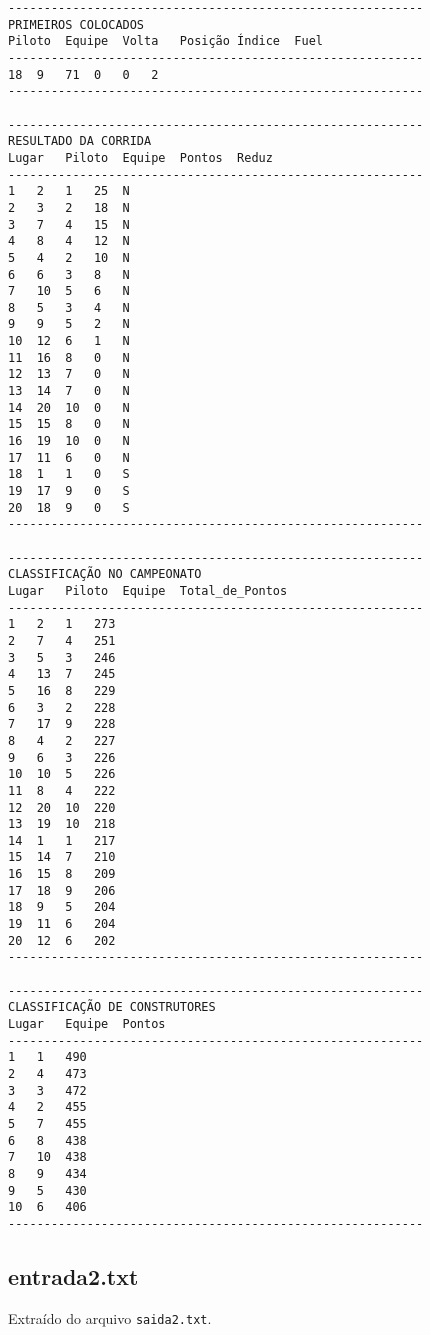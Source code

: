 \documentclass[12pt]{article}
\begin{document}
\begin{verbatim}
----------------------------------------------------------
PRIMEIROS COLOCADOS
Piloto	Equipe	Volta	Posição	Índice	Fuel
----------------------------------------------------------
18	9	71	0	0	2
----------------------------------------------------------

----------------------------------------------------------
RESULTADO DA CORRIDA
Lugar	Piloto	Equipe	Pontos	Reduz
----------------------------------------------------------
1	2	1	25	N
2	3	2	18	N
3	7	4	15	N
4	8	4	12	N
5	4	2	10	N
6	6	3	8	N
7	10	5	6	N
8	5	3	4	N
9	9	5	2	N
10	12	6	1	N
11	16	8	0	N
12	13	7	0	N
13	14	7	0	N
14	20	10	0	N
15	15	8	0	N
16	19	10	0	N
17	11	6	0	N
18	1	1	0	S
19	17	9	0	S
20	18	9	0	S
----------------------------------------------------------

----------------------------------------------------------
CLASSIFICAÇÃO NO CAMPEONATO
Lugar	Piloto	Equipe	Total_de_Pontos
----------------------------------------------------------
1	2	1	273
2	7	4	251
3	5	3	246
4	13	7	245
5	16	8	229
6	3	2	228
7	17	9	228
8	4	2	227
9	6	3	226
10	10	5	226
11	8	4	222
12	20	10	220
13	19	10	218
14	1	1	217
15	14	7	210
16	15	8	209
17	18	9	206
18	9	5	204
19	11	6	204
20	12	6	202
----------------------------------------------------------

----------------------------------------------------------
CLASSIFICAÇÃO DE CONSTRUTORES
Lugar	Equipe	Pontos
----------------------------------------------------------
1	1	490
2	4	473
3	3	472
4	2	455
5	7	455
6	8	438
7	10	438
8	9	434
9	5	430
10	6	406
----------------------------------------------------------
\end{verbatim}


\subsection*{entrada2.txt}

Extraído do arquivo \verb|saida2.txt|.
\end{document}
